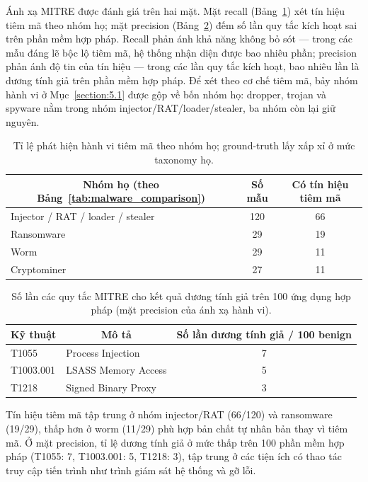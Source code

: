 \documentclass[../DoAn.tex]{subfiles}
\begin{document}
Ánh xạ MITRE được đánh giá trên hai mặt. Mặt recall
(Bảng~\ref{tab:injection-recall}) xét tín hiệu tiêm mã theo nhóm họ; mặt
precision (Bảng~\ref{tab:ttp-fp}) đếm số lần quy tắc kích hoạt sai trên phần
mềm hợp pháp. Recall phản ánh khả năng không bỏ sót --- trong các mẫu đáng
lẽ bộc lộ tiêm mã, hệ thống nhận diện được bao nhiêu phần; precision phản
ánh độ tin của tín hiệu --- trong các lần quy tắc kích hoạt, bao nhiêu lần
là dương tính giả trên phần mềm hợp pháp. Để xét theo cơ chế tiêm mã, bảy
nhóm hành vi ở
Mục~\ref{section:5.1} được gộp về bốn nhóm họ: dropper, trojan và spyware
nằm trong nhóm injector/RAT/loader/stealer, ba nhóm còn lại giữ nguyên.
\begin{table}[H]
\centering
\caption{Tỉ lệ phát hiện hành vi tiêm mã theo nhóm họ; ground-truth lấy xấp
  xỉ ở mức taxonomy họ.}
\label{tab:injection-recall}
\begin{tabular}{|l|c|c|}
\hline
\multicolumn{1}{|c|}{\textbf{Nhóm họ (theo Bảng~\ref{tab:malware_comparison})}} & \multicolumn{1}{c|}{\textbf{Số mẫu}} & \multicolumn{1}{c|}{\textbf{Có tín hiệu tiêm mã}} \\
\hline
Injector / RAT / loader / stealer & 120 & 66 \\
\hline
Ransomware                        & 29 & 19 \\
\hline
Worm                              & 29 & 11 \\
\hline
Cryptominer                       & 27 & 11 \\
\hline
\end{tabular}
\end{table}
\begin{table}[H]
\centering
\caption{Số lần các quy tắc MITRE cho kết quả dương tính giả trên 100 ứng
  dụng hợp pháp (mặt precision của ánh xạ hành vi).}
\label{tab:ttp-fp}
\begin{tabular}{|l|l|c|}
\hline
\multicolumn{1}{|c|}{\textbf{Kỹ thuật}} & \multicolumn{1}{c|}{\textbf{Mô tả}} & \multicolumn{1}{c|}{\textbf{Số lần dương tính giả / 100 benign}} \\
\hline
T1055     & Process Injection      & 7 \\
\hline
T1003.001 & LSASS Memory Access    & 5 \\
\hline
T1218     & Signed Binary Proxy    & 3 \\
\hline
\end{tabular}
\end{table}
Tín hiệu tiêm mã tập trung ở nhóm injector/RAT (66/120) và ransomware
(19/29), thấp hơn ở worm (11/29) phù hợp bản chất tự nhân bản thay vì tiêm
mã. Ở mặt precision, tỉ lệ dương tính giả ở mức thấp trên 100 phần mềm hợp
pháp (T1055: 7, T1003.001: 5, T1218: 3), tập trung ở các tiện ích có thao
tác truy cập tiến trình như trình giám sát hệ thống và gỡ lỗi.
\end{document}
